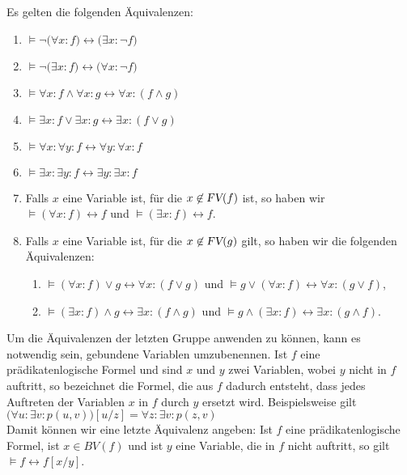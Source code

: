 \begin{Satz}
  Es gelten die folgenden Äquivalenzen:
  \begin{enumerate}
  \item $\models \neg\big(\forall x\colon f\big) \leftrightarrow \big(\exists x\colon \neg f\big)$
  \item $\models \neg\big(\exists x\colon f\big) \leftrightarrow \big(\forall x\colon \neg f\big)$
  \item $\models \forall x\colon f \wedge \forall x\colon g \leftrightarrow \forall x\colon (f \wedge g)$
  \item $\models \exists x\colon f \vee \exists x\colon g \leftrightarrow \exists x\colon (f \vee g)$
  \item $\models \forall x\colon \forall y\colon f \leftrightarrow \forall y\colon  \forall x\colon f$
  \item $\models \exists x\colon \exists y\colon f \leftrightarrow \exists y\colon  \exists x\colon f$
  \item Falls $x$ eine Variable ist, für die $x \not\in \textsl{FV}(f)$ ist, so haben wir \\[0.2cm]
        \hspace*{1.3cm} $\models  (\forall x\colon f) \leftrightarrow f$ \quad und \quad
                        $\models  (\exists x\colon f) \leftrightarrow f$.
  \item Falls $x$ eine Variable ist, für die  $x \not\in \textsl{FV}(g)$ gilt, so haben wir die folgenden Äquivalenzen:
    \begin{enumerate}
    \item $\models (\forall x\colon f) \vee g \leftrightarrow \forall x\colon (f \vee g)$ \quad und \quad $\models g \vee (\forall x\colon f) \leftrightarrow \forall x\colon (g \vee f)$,
    \item $\models (\exists x\colon f) \wedge g \leftrightarrow \exists x\colon (f \wedge g)$ \quad und \quad $\models g \wedge (\exists x\colon f) \leftrightarrow \exists x\colon (g \wedge f)$.
    \end{enumerate}
  \end{enumerate}
\end{Satz}

Um die Äquivalenzen der letzten Gruppe anwenden zu können, kann es notwendig sein,
gebundene Variablen umzubenennen. Ist $f$ eine prädikatenlogische Formel und sind $x$ und
$y$ zwei Variablen, wobei $y$ nicht in $f$ auftritt, so bezeichnet  die Formel, die aus $f$
dadurch entsteht, dass jedes Auftreten der Variablen $x$ in $f$ durch $y$ ersetzt wird.  Beispielsweise gilt \\[0.2cm]
\hspace*{1.3cm} $\bigl(\forall u : \exists v : p(u,v)\bigr)[u/z] = \forall z : \exists v : p(z,v)$
\\[0.2cm]
Damit können wir eine letzte Äquivalenz angeben: Ist $f$ eine prädikatenlogische Formel,
ist $x \in BV(f)$ und ist $y$ eine Variable, die in $f$ nicht auftritt, so gilt \\[0.2cm]
\hspace*{1.3cm} $\models f \leftrightarrow f[x/y]$.
\vspace{0.3cm}

